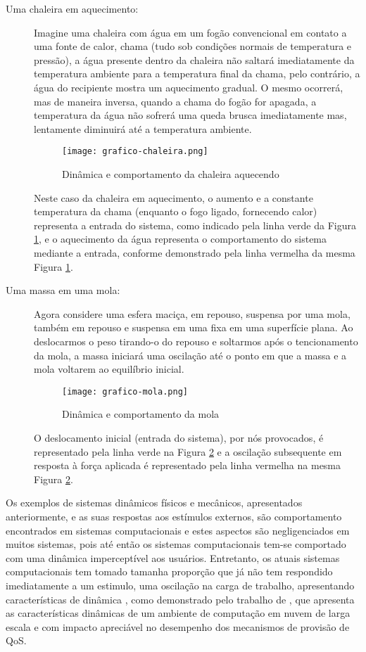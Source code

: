 \begin{description}
	\item[Uma chaleira em aquecimento:] Imagine uma chaleira com água em um fogão convencional em contato a uma fonte de calor, chama (tudo sob condições normais de temperatura e pressão), a água presente dentro da chaleira não saltará imediatamente da temperatura ambiente para a temperatura final da chama, pelo contrário, a água do recipiente mostra um aquecimento gradual. O mesmo ocorrerá, mas de maneira inversa, quando a chama do fogão for apagada, a temperatura da água não sofrerá uma queda brusca imediatamente mas, lentamente diminuirá até a temperatura ambiente.
	
	\begin{figure}[htb]
		\centering
		\texttt{[image: grafico-chaleira.png]}
		\caption{Dinâmica e comportamento da chaleira aquecendo}
		\label{fig:chaleira}
	\end{figure}
	
	Neste caso da chaleira em aquecimento, o aumento e a constante temperatura da chama (enquanto o fogo ligado, fornecendo calor) representa a entrada do sistema, como indicado pela linha verde da Figura \ref{fig:chaleira}, e o aquecimento da água representa o comportamento do sistema mediante a entrada, conforme demonstrado pela linha vermelha da mesma Figura \ref{fig:chaleira}. 
	
	\item[Uma massa em uma mola:] Agora considere uma esfera maciça, em repouso, suspensa por uma mola, também em repouso e suspensa em uma fixa em uma superfície plana. Ao deslocarmos o peso tirando-o do repouso e soltarmos após o tencionamento da mola, a massa iniciará uma oscilação até o ponto em que a massa e a mola voltarem ao equilíbrio inicial.	
	
	\begin{figure}[!htb]
		\centering
		\texttt{[image: grafico-mola.png]}
		\caption{Dinâmica e comportamento da mola}
		\label{fig:mola}		
	\end{figure}
	
	O deslocamento inicial (entrada do sistema), por nós provocados, é representado pela linha verde na Figura \ref{fig:mola} e a oscilação subsequente em resposta à força aplicada é representado pela linha vermelha na mesma Figura \ref{fig:mola}.
\end{description}

Os exemplos de sistemas dinâmicos físicos e mecânicos, apresentados anteriormente, e as suas respostas aos estímulos externos, são comportamento encontrados em sistemas computacionais e estes aspectos são negligenciados em muitos sistemas, pois até então os sistemas computacionais tem-se comportado com uma dinâmica imperceptível aos usuários. Entretanto, os atuais sistemas computacionais tem tomado tamanha proporção que já não tem respondido imediatamente a um estimulo, uma oscilação na carga de trabalho, apresentando características de dinâmica \cite{Janert2013}, como demonstrado pelo trabalho de , que apresenta as características dinâmicas de um ambiente de computação em nuvem de larga escala e com impacto apreciável no desempenho dos mecanismos de provisão de QoS.


